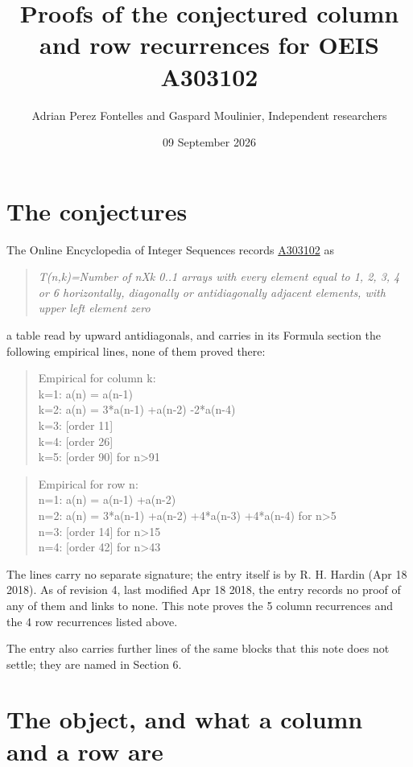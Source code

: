 \documentclass[11pt]{article}
\title{Proofs of the conjectured column and row recurrences for OEIS A303102}
\author{Adrian Perez Fontelles and Gaspard Moulinier, Independent researchers}
\date{09 September 2026}
\theoremstyle{definition}
\begin{document}
\maketitle
\section{The conjectures}

The Online Encyclopedia of Integer Sequences records \href{https://oeis.org/A303102}{A303102} as

\begin{quote}\itshape T(n,k)=Number of nXk 0..1 arrays with every element equal to 1, 2, 3, 4 or 6 horizontally, diagonally or antidiagonally adjacent elements, with upper left element zero\end{quote}

a table read by upward antidiagonals, and carries in its Formula section the following empirical lines, none of them proved there:

\begin{quote}\ttfamily Empirical for column k:\\
k=1: a(n) = a(n-1)\\k=2: a(n) = 3*a(n-1) +a(n-2) -2*a(n-4)\\k=3: [order 11]\\k=4: [order 26]\\k=5: [order 90] for n>91\end{quote}

\begin{quote}\ttfamily Empirical for row n:\\
n=1: a(n) = a(n-1) +a(n-2)\\n=2: a(n) = 3*a(n-1) +a(n-2) +4*a(n-3) +4*a(n-4) for n>5\\n=3: [order 14] for n>15\\n=4: [order 42] for n>43\end{quote}

The lines carry no separate signature; the entry itself is by R. H. Hardin (Apr 18 2018). As of revision 4, last modified Apr 18 2018, the entry records no proof of any of them and links to none. This note proves the 5 column recurrences and the 4 row recurrences listed above.

The entry also carries further lines of the same blocks that this note does not settle; they are named in Section 6.

\section{The object, and what a column and a row are}
\end{document}

